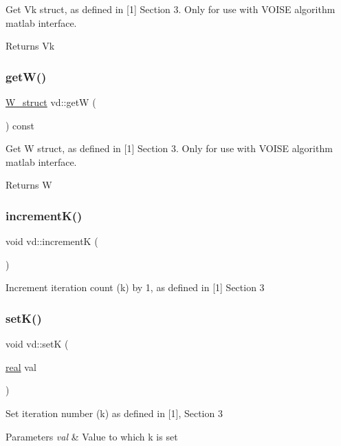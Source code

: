 Get Vk struct, as defined in \mbox{[}1\mbox{]} Section 3. Only for use with V\+O\+I\+SE algorithm matlab interface. \begin{DoxyReturn}{Returns}
Vk 
\end{DoxyReturn}
\mbox{\label{classvd_ab4d0d9ea76cedf1a6825b62c9ec2d118}} 
\subsubsection{\texorpdfstring{get\+W()}{getW()}}
{\footnotesize\ttfamily \mbox{\hyperlink{structW__struct}{W\+\_\+struct}} vd\+::getW (\begin{DoxyParamCaption}{ }\end{DoxyParamCaption}) const}

Get W struct, as defined in \mbox{[}1\mbox{]} Section 3. Only for use with V\+O\+I\+SE algorithm matlab interface. \begin{DoxyReturn}{Returns}
W 
\end{DoxyReturn}
\mbox{\label{classvd_a59c1f5756af7de9cc7a0089221cbd5b7}} 
\subsubsection{\texorpdfstring{increment\+K()}{incrementK()}}
{\footnotesize\ttfamily void vd\+::incrementK (\begin{DoxyParamCaption}{ }\end{DoxyParamCaption})}

Increment iteration count (k) by 1, as defined in \mbox{[}1\mbox{]} Section 3 \mbox{\label{classvd_a7c692a97b49c4596c4ec1bc0a129b516}} 
\subsubsection{\texorpdfstring{set\+K()}{setK()}}
{\footnotesize\ttfamily void vd\+::setK (\begin{DoxyParamCaption}\item[{\mbox{\hyperlink{typedefs_8cpp_a58a0c7cf2501f4492da833421be92547}{real}}}]{val }\end{DoxyParamCaption})}

Set iteration number (k) as defined in \mbox{[}1\mbox{]}, Section 3 
\begin{DoxyParams}{Parameters}
{\em val} & Value to which k is set \\
\hline
\end{DoxyParams}
\mbox{\label{classvd_ae13e9e465d08425218bd8f85ce420c05}} 
